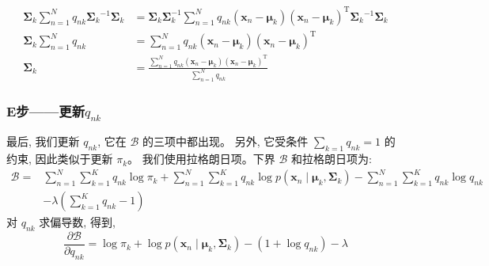 \documentclass[UTF8]{ctexart}
\begin{document}
$$
\begin{aligned}
\boldsymbol{\Sigma}_{k} \sum_{n=1}^{N} q_{n k} \boldsymbol{\Sigma}_{k}{ }^{-1} \boldsymbol{\Sigma}_{k} &=\boldsymbol{\Sigma}_{k} \boldsymbol{\Sigma}_{k}^{-1} \sum_{n=1}^{N} q_{n k}\left(\boldsymbol{x}_{n}-\boldsymbol{\mu}_{k}\right)\left(\boldsymbol{x}_{n}-\boldsymbol{\mu}_{k}\right)^{\mathrm{T}} \boldsymbol{\Sigma}_{k}{ }^{-1} \boldsymbol{\Sigma}_{k} \\
\boldsymbol{\Sigma}_{k} \sum_{n=1}^{N} q_{n k} &=\sum_{n=1}^{N} q_{n k}\left(\boldsymbol{x}_{n}-\boldsymbol{\mu}_{k}\right)\left(\boldsymbol{x}_{n}-\boldsymbol{\mu}_{k}\right)^{\mathrm{T}} \\
\boldsymbol{\Sigma}_{k} &=\frac{\sum_{n=1}^{N} q_{n k}\left(\boldsymbol{x}_{n}-\boldsymbol{\mu}_{k}\right)\left(\boldsymbol{x}_{n}-\boldsymbol{\mu}_{k}\right)^{\mathrm{T}}}{\sum_{n=1}^{N} q_{n k}}
\end{aligned}
$$

\subsubsection{E步——更新$q_{nk}$}
最后, 我们更新 $q_{n k}$, 它在 $\mathcal{B}$ 的三项中都出现。
另外, 它受条件 $\sum_{k=1} q_{n k}=1$ 的约束, 因此类似于更新 $\pi_{k}$。
我们使用拉格朗日项。下界 $\mathcal{B}$ 和拉格朗日项为:
$$
\begin{aligned}
\mathcal{B}=& \sum_{n=1}^{N} \sum_{k=1}^{K} q_{n k} \log \pi_{k}+\sum_{n=1}^{N} \sum_{k=1}^{K} q_{n k} \log p\left(\boldsymbol{x}_{n} \mid \boldsymbol{\mu}_{k}, \boldsymbol{\Sigma}_{k}\right)-\sum_{n=1}^{N} \sum_{k=1}^{K} q_{n k} \log q_{n k} \\
&-\lambda\left(\sum_{k=1}^{K} q_{n k}-1\right)
\end{aligned}
$$
对 $q_{n k}$ 求偏导数, 得到,
$$
\frac{\partial \mathcal{B}}{\partial q_{n k}}=\log \pi_{k}+\log p\left(\boldsymbol{x}_{n} \mid \boldsymbol{\mu}_{k}, \boldsymbol{\Sigma}_{k}\right)-\left(1+\log q_{n k}\right)-\lambda
$$
\end{document}

